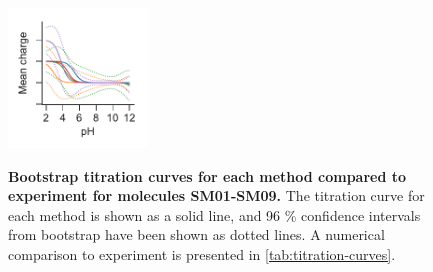 \documentclass[9pt,lineno,final]{elife}
\begin{document}
\begin{figure}[H]
	\includegraphics[width=0.33\textwidth]{Reports/overview-virtual-titration-SM09.pdf}	 \\
	\caption{{\bf Bootstrap titration curves for each method compared to experiment for molecules SM01-SM09.} The titration curve for each method is shown as a solid line, and 96 \% confidence intervals from bootstrap have been shown as dotted lines. A numerical comparison to experiment is presented in \cref{tab:titration-curves}.
	\label{fig:charge-curves1}}
	\end{figure}
	
\end{document}
